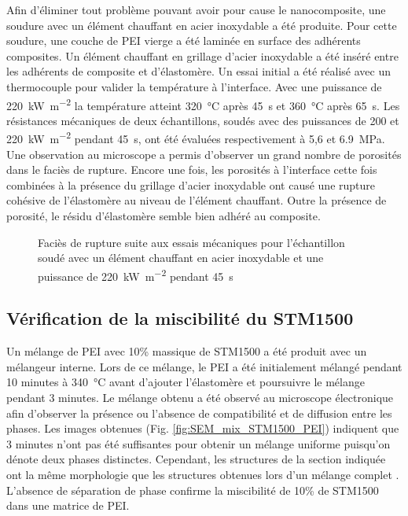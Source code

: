 Afin d'éliminer tout problème pouvant avoir pour cause le nanocomposite, une soudure avec un élément chauffant en acier inoxydable a été produite. 
Pour cette soudure, une couche de PEI vierge a été laminée en surface des adhérents composites.
Un élément chauffant en grillage d'acier inoxydable a été inséré entre les adhérents de composite et d'élastomère. 
Un essai initial a été réalisé avec un thermocouple pour valider la température à l'interface. 
Avec une puissance de \SI{220}{\kilo\watt\per\square\metre} la température atteint \SI{320}{\celsius} après \SI{45}{\second} et \SI{360}{\celsius} après \SI{65}{\second}. 
Les résistances mécaniques de deux échantillons, soudés avec des puissances de 200 et \SI{220}{\kilo\watt\per\square\metre} pendant \SI{45}{\second}, ont été évaluées respectivement à 5,6 et \SI{6,9}{\mega\pascal}. 
Une observation au microscope a permis d'observer un grand nombre de porosités dans le faciès de rupture. 
Encore une fois, les porosités à l'interface cette fois combinées à la présence du grillage d'acier inoxydable ont causé une rupture cohésive de l'élastomère au niveau de l'élément chauffant. 
Outre la présence de porosité, le résidu d'élastomère semble bien adhéré au composite.  

\begin{figure}[h]
	\centering
	 \qquad
	\caption{Faciès de rupture suite aux essais mécaniques pour l'échantillon soudé avec un élément chauffant en acier inoxydable et une puissance de \SI{220}{\kilo\watt\per\square\metre} pendant \SI{45}{\second}}
	\label{fig:STM1500_facies_soudure_SS}
\end{figure}

\subsection{Vérification de la miscibilité du STM1500}

Un mélange de PEI avec 10\% massique de STM1500 a été produit avec un mélangeur interne. 
Lors de ce mélange, le PEI a été initialement mélangé pendant 10 minutes à \SI{340}{\celsius} avant d'ajouter l'élastomère et poursuivre le mélange pendant 3 minutes. 
Le mélange obtenu a été observé au microscope électronique afin d'observer la présence ou l'absence de compatibilité et de diffusion entre les phases. 
Les images obtenues (Fig. \ref{fig:SEM_mix_STM1500_PEI}) indiquent que 3 minutes n'ont pas été suffisantes pour obtenir un mélange uniforme puisqu'on dénote deux phases distinctes. 
Cependant, les structures de la section indiquée ont la même morphologie que les structures obtenues lors d'un mélange complet \cite{Hatui2015}. 
L'absence de séparation de phase confirme la miscibilité de 10\% de STM1500 dans une matrice de PEI. 

